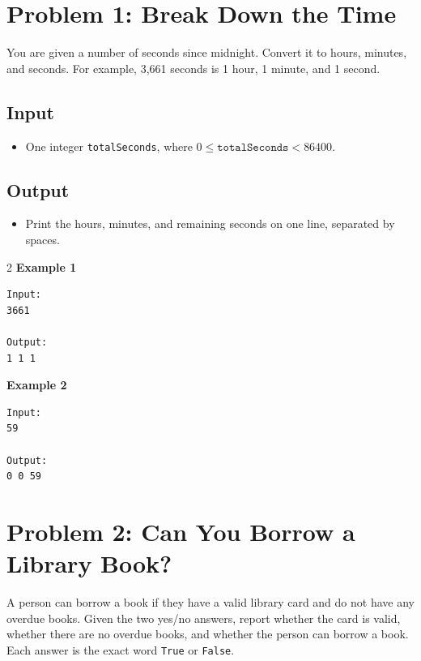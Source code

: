 \documentclass[12pt,oneside,openany]{article}
\begin{document}
\newpage
\section*{Problem 1: Break Down the Time}

You are given a number of seconds since midnight. Convert it to hours, minutes, and seconds. For example, 3,661 seconds is 1 hour, 1 minute, and 1 second.

\subsection*{Input}
\begin{itemize}
    \item One integer \texttt{totalSeconds}, where $0 \leq \texttt{totalSeconds} < 86400$.
\end{itemize}

\subsection*{Output}
\begin{itemize}
    \item Print the hours, minutes, and remaining seconds on one line, separated by spaces.
\end{itemize}

\vspace{0.2cm}

\begin{example*}{}{}
\begin{multicols}{2}
\textbf{Example 1}
\begin{verbatim}
Input:
3661

Output:
1 1 1
\end{verbatim}
\textbf{Example 2}
\begin{verbatim}
Input:
59

Output:
0 0 59
\end{verbatim}
\end{multicols}
\end{example*}
\newpage
\section*{Problem 2: Can You Borrow a Library Book?}

A person can borrow a book if they have a valid library card and do not have any overdue books. Given the two yes/no answers, report whether the card is valid, whether there are no overdue books, and whether the person can borrow a book. Each answer is the exact word \texttt{True} or \texttt{False}.
\end{document}
